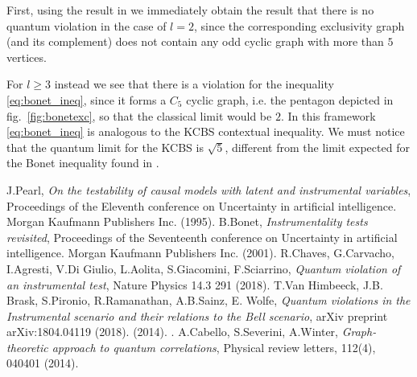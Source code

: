 \documentclass[floatfix, twocolumn, aps, prl]{revtex4-1}
\begin{document}
First, using the result in \cite{cabello2014} we immediately obtain the result
that there is no quantum violation in the case of $l=2$, since the corresponding
exclusivity graph (and its complement) does not contain any odd cyclic graph
with more than $5$ vertices.  

For $l\ge3$ instead we see that there is a violation for the inequality \eqref{eq:bonet_ineq}, 
since it forms a $C_5$ cyclic graph, i.e. the pentagon depicted in
fig.~\ref{fig:bonetexc}, so that the classical limit would be $2$.
In this framework \eqref{eq:bonet_ineq} is analogous to the KCBS contextual
inequality.
We must notice that the quantum limit for the KCBS is $\sqrt{5}$, different
from the limit expected for the Bonet inequality found in \cite{himbeeck2018}.

\begin{thebibliography}{}
     J.Pearl, {\em On the testability of causal models with
        latent and instrumental variables}, 
        Proceedings of the Eleventh conference on Uncertainty in artificial
        intelligence. Morgan Kaufmann Publishers Inc. (1995).
     B.Bonet, {\em Instrumentality tests revisited},
        Proceedings of the Seventeenth conference on Uncertainty in artificial
        intelligence. Morgan Kaufmann Publishers Inc. (2001).
     R.Chaves, G.Carvacho, I.Agresti, V.Di Giulio, L.Aolita,
        S.Giacomini, F.Sciarrino, 
        {\em Quantum violation of an instrumental test}, 
        Nature Physics 14.3 291 (2018).
      T.Van Himbeeck, J.B. Brask, S.Pironio, R.Ramanathan, A.B.Sainz, E. Wolfe, 
        {\em Quantum violations in the Instrumental scenario and their relations to the Bell scenario},
        arXiv preprint arXiv:1804.04119 (2018).
         (2014). . 
      A.Cabello, S.Severini, A.Winter,
         {\em Graph-theoretic approach to quantum correlations}, 
         Physical review letters, 112(4), 040401 (2014).
\end{thebibliography}
\end{document}
